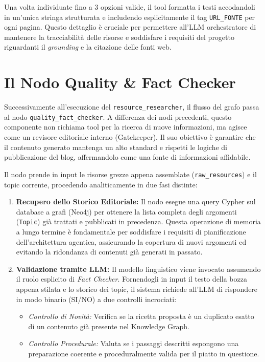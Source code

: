 \documentclass[11pt, a4paper]{article}
\begin{document}
Una volta individuate fino a 3 opzioni valide, il tool formatta i testi accodandoli in un'unica stringa strutturata e includendo esplicitamente il tag \texttt{URL\_FONTE} per ogni pagina. Questo dettaglio è cruciale per permettere all'LLM orchestratore di mantenere la tracciabilità delle risorse e soddisfare i requisiti del progetto riguardanti il \textit{grounding} e la citazione delle fonti web.
\section{Il Nodo Quality \& Fact Checker}

Successivamente all'esecuzione del \texttt{resource\_researcher}, il flusso del grafo passa al nodo \texttt{quality\_fact\_checker}. A differenza dei nodi precedenti, questo componente non richiama tool per la ricerca di nuove informazioni, ma agisce come un revisore editoriale interno (Gatekeeper). Il suo obiettivo è garantire che il contenuto generato mantenga un alto standard e rispetti le logiche di pubblicazione del blog, affermandolo come una fonte di informazioni affidabile.

Il nodo prende in input le risorse grezze appena assemblate (\texttt{raw\_resources}) e il topic corrente, procedendo analiticamente in due fasi distinte:

\begin{enumerate}
    \item \textbf{Recupero dello Storico Editoriale:} Il nodo esegue una query Cypher sul database a grafi (Neo4j) per ottenere la lista completa degli argomenti (\texttt{Topic}) già trattati e pubblicati in precedenza. Questa operazione di memoria a lungo termine è fondamentale per soddisfare i requisiti di pianificazione dell'architettura agentica, assicurando la copertura di nuovi argomenti ed evitando la ridondanza di contenuti già generati in passato.
    
    \item \textbf{Validazione tramite LLM:} Il modello linguistico viene invocato assumendo il ruolo esplicito di \textit{Fact Checker}. Fornendogli in input il testo della bozza appena stilata e lo storico dei topic, il sistema richiede all'LLM di rispondere in modo binario (SI/NO) a due controlli incrociati:
    \begin{itemize}
        \item \textit{Controllo di Novità:} Verifica se la ricetta proposta è un duplicato esatto di un contenuto già presente nel Knowledge Graph.
        \item \textit{Controllo Procedurale:} Valuta se i passaggi descritti espongono una preparazione coerente e proceduralmente valida per il piatto in questione.
    \end{itemize}
\end{enumerate}
\end{document}
